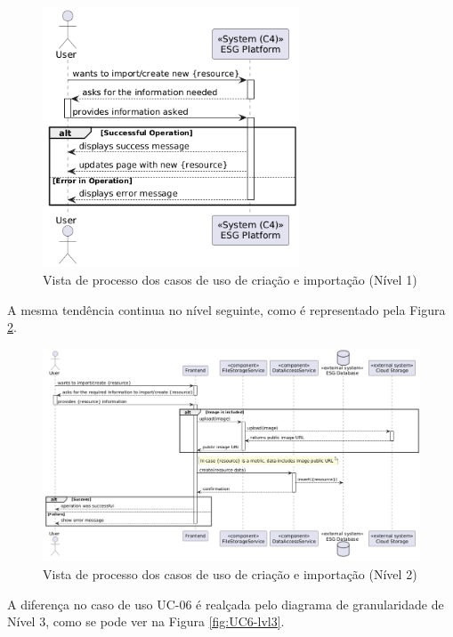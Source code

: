 \begin{figure}[H]
\centering
\includegraphics[width=3in]{frontmatter/assets/diagrams/Process Views/UC67-lvl1.png}
\caption{Vista de processo dos casos de uso de criação e importação (Nível 1)}
\label{fig:UC67-lvl1}
\end{figure}

A mesma tendência continua no nível seguinte, como é representado pela Figura \ref{fig:UC67-lvl2}.

\begin{figure}[H]
\centering
\includegraphics[width=\linewidth]{frontmatter/assets/diagrams/Process Views/UC67-lvl2.png}
\caption{Vista de processo dos casos de uso de criação e importação (Nível 2)}
\label{fig:UC67-lvl2}
\end{figure}

A diferença no caso de uso UC-06 é realçada pelo diagrama de granularidade de Nível 3, como se pode ver na Figura \ref{fig:UC6-lvl3}.


